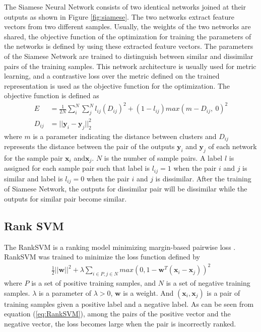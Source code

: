\documentclass[runningheads,a4paper]{llncs}
\begin{document}
The Siamese Neural Network \cite{Bromely1993,Chopra2005,Hadsell2006} consists of two identical networks joined at their outputs as shown in Figure \ref{fig:siamese}.
The two networks extract feature vectors from two different samples.
Usually, the weights of the two networks are shared, the objective function of the optimization for training the parameters of the networks is defined by using these extracted feature vectors.
The parameters of the Siamese Network are trained to distinguish between similar and dissimilar pairs of the training samples. 
This network architecture is usually used for metric learning, and a contrastive loss over the metric defined on the trained representation is used as the objective function for the optimization. The objective function is defined as
\begin{align} \label{eq:contrastive}
E&=\frac{1}{2N}\sum_i^N \sum_j^N l_{ij}(D_{ij})^2 + (1-l_{ij})max(m-D_{ij}, ~0)^2 \\
D_{ij}&=||{\bm y}_{i}-{\bm y}_{j}||^2_2
\label{eq:dis}
\end{align}
where $m$ is a parameter indicating the distance between clusters and 
$D_{ij}$ represents the distance between the pair of the outputs $\bm{y}_i$ and $\bm{y}_j$ of each network for the sample pair $\bm{x}_i$ and$\bm{x}_j$.
$N$ is the number of sample pairs.
A label $l$ is assigned for each sample pair such that 
label is $l_{ij}=1$ when the pair $i$ and $j$ is similar and label is $l_{ij}=0$ when the pair $i$ and $j$ is dissimilar.
After the training of Siamese Network, the outputs for dissimilar pair will be dissimilar while the outputs for similar pair become similar.


\subsection{Rank SVM}

The RankSVM is a ranking model minimizing margin-based pairwise loss \cite{RankSVM}.
RankSVM was trained to minimize the loss function defined by
\begin{align} \label{eq:RankSVM}
    \frac{1}{2}||{\bm w}||^2+\lambda \sum_{i \in P, j \in N}max(0, 1-{\bm w}^T({\bm x}_i - {\bm x}_j))^2
\end{align}
where $P$ is a set of positive training samples, and $N$ is a set of negative training samples. 
$\lambda$ is a parameter of $\lambda > 0$, ${\bm w}$ is a weight.
And $({\bm x}_i, {\bm x}_j)$ is a pair of training samples given a positive label and a negative label.
As can be seen from equation (\ref{eq:RankSVM}), among the pairs of the positive vector and the negative vector, the loss becomes large when the pair is incorrectly ranked.
\end{document}
